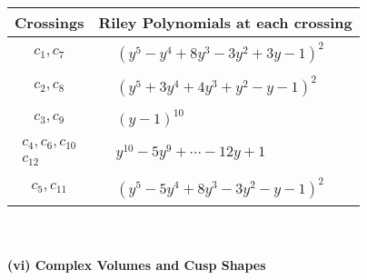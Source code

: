 \documentclass[1p]{elsarticle_modified}
\theoremstyle{definition}
\begin{document}
\begin{tabular}{m{50pt}|m{274pt}}
Crossings & \hspace{64pt}Riley Polynomials at each crossing \\
\hline $$\begin{aligned}c_{1},c_{7}\end{aligned}$$&$\begin{aligned}
&(y^5- y^4+8 y^3-3 y^2+3 y-1)^2
\end{aligned}$\\
\hline $$\begin{aligned}c_{2},c_{8}\end{aligned}$$&$\begin{aligned}
&(y^5+3 y^4+4 y^3+y^2- y-1)^2
\end{aligned}$\\
\hline $$\begin{aligned}c_{3},c_{9}\end{aligned}$$&$\begin{aligned}
&(y-1)^{10}
\end{aligned}$\\
\hline $$\begin{aligned}c_{4},c_{6},c_{10}\\c_{12}\end{aligned}$$&$\begin{aligned}
&y^{10}-5 y^9+\cdots-12 y+1
\end{aligned}$\\
\hline $$\begin{aligned}c_{5},c_{11}\end{aligned}$$&$\begin{aligned}
&(y^5-5 y^4+8 y^3-3 y^2- y-1)^2
\end{aligned}$\\
\hline
\end{tabular}\\~\\
\newpage\flushleft \textbf{(vi) Complex Volumes and Cusp Shapes}
\end{document}
